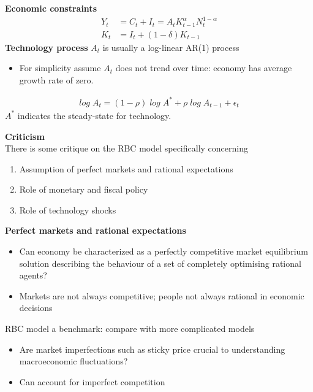 \documentclass{beamer}
\begin{document}
\begin{frame}
 \textbf{Economic constraints}
\begin{align}
  Y_t &= C_t + I_t = A_tK^\alpha_{t-1}N^{1-\alpha}_t\\
  K_t &= I_t + (1-\delta)K_{t-1}
\end{align}
  \textbf{Technology process}  $A_t$ is usually a log-linear AR(1) process
   \begin{itemize}
    \item For simplicity assume $A_t$ does not trend over time: economy has average growth rate of zero.
  \end{itemize}
 \begin{align}
  log\; A_t= (1-\rho) \;log\; A^* + \rho\; log\; A_{t-1} + \epsilon_t
\end{align}
$A^*$ indicates the steady-state for technology.
\end{frame}

\begin{frame}
  \textbf{Criticism}\\
  There is some critique on the RBC model specifically concerning
  \begin{enumerate}
    \item Assumption of perfect markets and rational expectations
    \item Role of monetary and fiscal policy
    \item Role of technology shocks
  \end{enumerate}  
\end{frame}

\begin{frame}
  \textbf{Perfect markets and rational expectations}\\  
  \begin{itemize}
    \item  Can economy be characterized as a perfectly competitive market equilibrium solution describing the behaviour of a set of
completely optimising rational agents?
     \item Markets are not always competitive; people not always rational in economic decisions
  \end{itemize}
  \medskip
  RBC model a benchmark: compare with more complicated models
  \begin{itemize}
    \item Are market imperfections such as sticky price crucial to understanding macroeconomic fluctuations?
    \item Can account for imperfect competition
  \end{itemize}
\end{frame}
\end{document}
